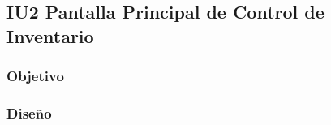\newpage
\subsection{IU2 Pantalla Principal de Control de Inventario}

\subsubsection{Objetivo}

\subsubsection{Diseño}
